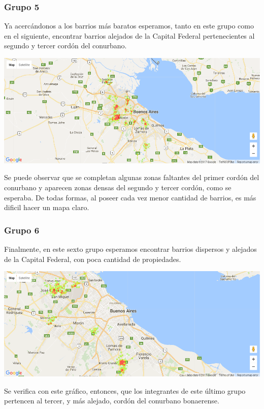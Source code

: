 \documentclass[a4paper, 10pt]{article}
\newcommand\tab[1][0.5cm]{\hspace*{#1}}
\begin{document}
				\subsubsection{Grupo 5}
					Ya acercándonos a los barrios más baratos esperamos, tanto en este grupo como en el siguiente, encontrar
					barrios alejados de la Capital Federal pertenecientes al segundo y tercer cordón del conurbano.
					\begin{center}
						\includegraphics[width=\textwidth]{images/m2Group5HeatMap}
				  	\end{center}
				  	\tab Se puede observar que se completan algunas zonas faltantes del primer cordón del conurbano y aparecen zonas
				  	densas del segundo y tercer cordón, como se esperaba. De todas formas, al poseer cada vez menor cantidad de
				  	barrios, es más dificil hacer un mapa claro.
				\subsubsection{Grupo 6}
					Finalmente, en este sexto grupo esperamos encontrar barrios dispersos y alejados de la Capital Federal, con poca
					cantidad de propiedades.
					\begin{center}
						\includegraphics[width=\textwidth]{images/m2Group6HeatMap}
				  	\end{center}
				  	\tab Se verifica con este gráfico, entonces, que los integrantes de este último grupo pertencen al tercer,
				  	y más alejado, cordón del conurbano bonaerense.
\end{document}
